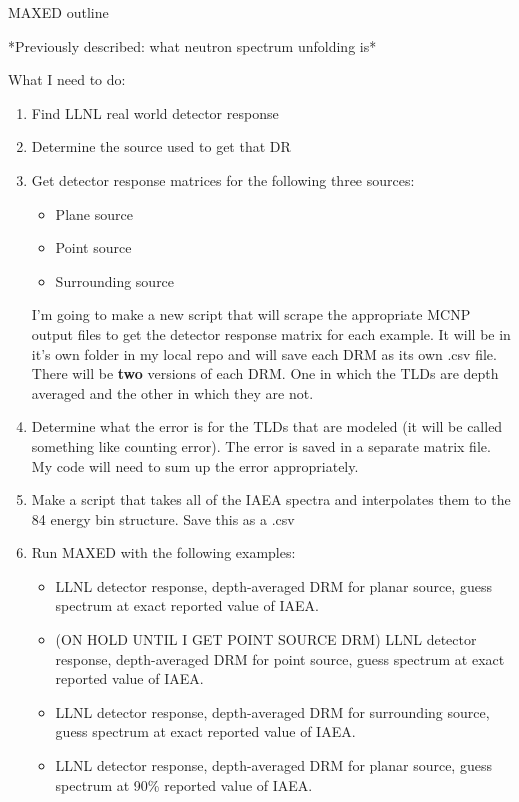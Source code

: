 \documentclass[11pt]{article}
\begin{document}
\begin{center}
MAXED outline
\end{center}
*Previously described: what neutron spectrum unfolding is*\\

\hfill


What I need to do:
\begin{enumerate}
\item Find LLNL real world detector response
\item Determine the source used to get that DR
\item Get detector response matrices for the following three sources:
\begin{itemize}
\item[\checkmark] Plane source
\item Point source
\item[\checkmark] Surrounding source
\end{itemize}
I'm going to make a new script that will scrape the appropriate MCNP output files to get the detector response matrix for each example. It will be in it's own folder in my local repo and will save each DRM as its own .csv file. There will be \textbf{two} versions of each DRM. One in which the TLDs are depth averaged and the other in which they are not.
\item[\checkmark] Determine what the error is for the TLDs that are modeled (it will be called something like counting error). The error is saved in a separate matrix file. My code will need to sum up the error appropriately.
\item Make a script that takes all of the IAEA spectra and interpolates them to the 84 energy bin structure. Save this as a .csv
\item Run MAXED with the following examples:
	\begin{itemize}
	\item[\checkmark] LLNL detector response, depth-averaged DRM for planar source, guess spectrum at exact reported value of IAEA.
	\item (ON HOLD UNTIL I GET POINT SOURCE DRM) LLNL detector response, depth-averaged DRM for point source, guess spectrum at exact reported value of IAEA.
	\item[\checkmark] LLNL detector response, depth-averaged DRM for surrounding source, guess spectrum at exact reported value of IAEA.
	\item[\checkmark] LLNL detector response, depth-averaged DRM for planar source, guess spectrum at 90\% reported value of IAEA.

\end{itemize}
\end{enumerate}
\end{document}
